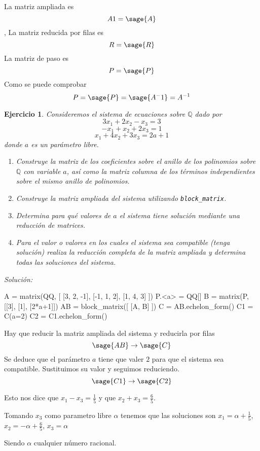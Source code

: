 \documentclass{amsart}
\newtheorem{ejer}{Ejercicio}
\begin{document}
La matriz ampliada es $$ A1 = \sage{A} $$,
La matriz reducida por filas es $$ R = \sage{R} $$
La matriz de paso es $$ P = \sage{P} $$
Como se puede comprobar $$ P = \sage{P} = \sage{A^-1} = A^{-1}$$


\begin{ejer}
Consideremos el sistema de ecuaciones sobre ${\mathbb Q}$ dado por
$$ 3 x_1 + 2 x_2 - x_3 = 3 $$
$$ -x_1 + x_2 + 2 x_3 = 1 $$
$$ x_1 + 4 x_2 + 3 x_3 = 2a+1 $$
donde $a$ es un parámetro libre. 
\begin{enumerate}
\item  Construye la matriz de los coeficientes
sobre el anillo de los polinomios sobre ${\mathbb Q}$ con variable $a$, así como 
la matriz columna de los términos independientes sobre el mismo anillo de 
polinomios. 
\item Construye la matriz ampliada del sistema utilizando \verb|block_matrix|.
\item Determina para qué valores de $a$ el sistema tiene solución mediante una
reducción de matrices.
\item Para el valor o valores en los cuales el sistema sea compatible (tenga
solución) realiza la reducción completa de la matriz ampliada y determina todas
las soluciones del sistema.
\end{enumerate}
\end{ejer}
{\it Solución: }


\begin{sageblock}
A = matrix(QQ, [ [3, 2, -1], [-1, 1, 2], [1, 4, 3] ])
P.<a> = QQ[]
B = matrix(P, [[3], [1], [2*a+1]])
AB = block_matrix([ [A, B] ])
C = AB.echelon_form()
C1 = C(a=2)
C2 = C1.echelon_form()
\end{sageblock}


Hay que reducir la matriz ampliada del sistema y reducirla por filas
$$ \sage{AB} \to \sage{C} $$
Se deduce que el parámetro $a$ tiene que valer $2$ para que el sistema sea compatible. Sustituimos su valor y seguimos reduciendo.
$$ \sage{C1} \to \sage{C2} $$

Esto nos dice que $x_1 - x_3 = \frac{1}{5}$ y que $x_2 + x_3 = \frac{6}{5}$.

Tomando $x_3$ como parametro libre $\alpha$ tenemos que las soluciones son $x_1 = \alpha + \frac{1}{5}$, $x_2 = -\alpha + \frac{6}{5}$, $x_3 = \alpha$

Siendo $\alpha$ cualquier número racional.
\end{document}
